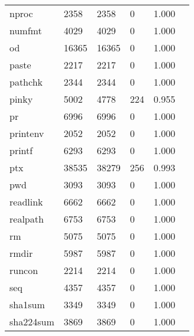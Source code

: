 \begin{longtable}{lp{2.20cm}p{2.20cm}p{2.20cm}p{2.20cm}p{2.20cm}}
nproc     &                     2358 &         2358 &             0 &                    1.000 \\
numfmt    &                     4029 &         4029 &             0 &                    1.000 \\
od        &                    16365 &        16365 &             0 &                    1.000 \\
paste     &                     2217 &         2217 &             0 &                    1.000 \\
pathchk   &                     2344 &         2344 &             0 &                    1.000 \\
pinky     &                     5002 &         4778 &           224 &                    0.955 \\
pr        &                     6996 &         6996 &             0 &                    1.000 \\
printenv  &                     2052 &         2052 &             0 &                    1.000 \\
printf    &                     6293 &         6293 &             0 &                    1.000 \\
ptx       &                    38535 &        38279 &           256 &                    0.993 \\
pwd       &                     3093 &         3093 &             0 &                    1.000 \\
readlink  &                     6662 &         6662 &             0 &                    1.000 \\
realpath  &                     6753 &         6753 &             0 &                    1.000 \\
rm        &                     5075 &         5075 &             0 &                    1.000 \\
rmdir     &                     5987 &         5987 &             0 &                    1.000 \\
runcon    &                     2214 &         2214 &             0 &                    1.000 \\
seq       &                     4357 &         4357 &             0 &                    1.000 \\
sha1sum   &                     3349 &         3349 &             0 &                    1.000 \\
sha224sum &                     3869 &         3869 &             0 &                    1.000 \\

\end{longtable}
